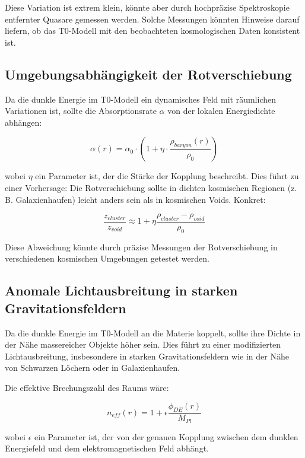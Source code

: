 \documentclass[a4paper,12pt]{article}
\theoremstyle{definition}
\theoremstyle{remark}
\begin{document}
	Diese Variation ist extrem klein, könnte aber durch hochpräzise Spektroskopie entfernter Quasare gemessen werden. Solche Messungen könnten Hinweise darauf liefern, ob das T0-Modell mit den beobachteten kosmologischen Daten konsistent ist.
	
	\subsection{Umgebungsabhängigkeit der Rotverschiebung}
	Da die dunkle Energie im T0-Modell ein dynamisches Feld mit räumlichen Variationen ist, sollte die Absorptionsrate $\alpha$ von der lokalen Energiedichte abhängen:
	
	\begin{equation}
		\alpha(r) = \alpha_0 \cdot \left(1 + \eta \cdot \frac{\rho_{baryon}(r)}{\rho_0}\right)
	\end{equation}
	
	wobei $\eta$ ein Parameter ist, der die Stärke der Kopplung beschreibt. Dies führt zu einer Vorhersage: Die Rotverschiebung sollte in dichten kosmischen Regionen (z. B. Galaxienhaufen) leicht anders sein als in kosmischen Voids. Konkret:
	
	\begin{equation}
		\frac{z_{cluster}}{z_{void}} \approx 1 + \eta\frac{\rho_{cluster} - \rho_{void}}{\rho_0}
	\end{equation}
	
	Diese Abweichung könnte durch präzise Messungen der Rotverschiebung in verschiedenen kosmischen Umgebungen getestet werden.
	
	\subsection{Anomale Lichtausbreitung in starken Gravitationsfeldern}
	Da die dunkle Energie im T0-Modell an die Materie koppelt, sollte ihre Dichte in der Nähe massereicher Objekte höher sein. Dies führt zu einer modifizierten Lichtausbreitung, insbesondere in starken Gravitationsfeldern wie in der Nähe von Schwarzen Löchern oder in Galaxienhaufen.
	
	Die effektive Brechungszahl des Raums wäre:
	
	\begin{equation}
		n_{eff}(r) = 1 + \epsilon \frac{\phi_{DE}(r)}{M_{Pl}}
	\end{equation}
	
	wobei $\epsilon$ ein Parameter ist, der von der genauen Kopplung zwischen dem dunklen Energiefeld und dem elektromagnetischen Feld abhängt.
	
\end{document}
